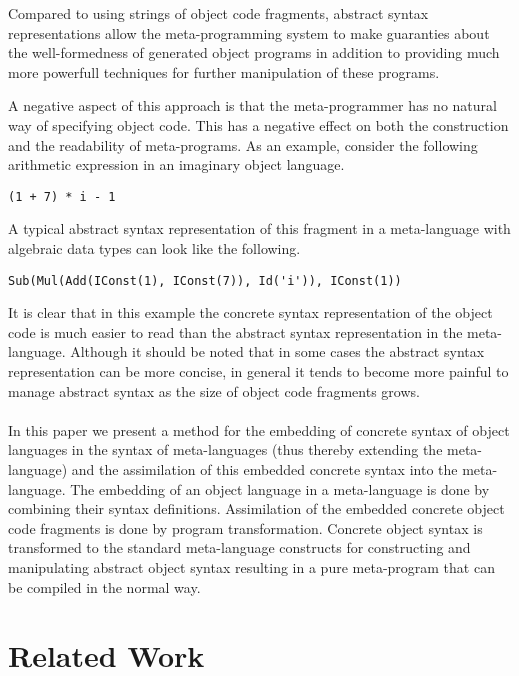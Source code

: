 \documentclass[a4paper,11pt]{article}
\begin{document}
Compared to using strings of object code fragments, abstract syntax
representations allow the meta-programming system to make guaranties about the
well-formedness of generated object programs in addition to providing much more
powerfull techniques for further manipulation of these programs.

A negative aspect of this approach is that the meta-programmer has no natural
way of specifying object code. This has a negative effect on both the
construction and the readability of meta-programs. As an example, consider the
following arithmetic expression in an imaginary object language.
\begin{lstlisting}[title=Example expression in concrete syntax]
(1 + 7) * i - 1
\end{lstlisting}
A typical abstract syntax representation of this fragment in a meta-language
with algebraic data types can look like the following.
\begin{lstlisting}[title=Example expression in abstract syntax]
Sub(Mul(Add(IConst(1), IConst(7)), Id('i')), IConst(1))
\end{lstlisting}
It is clear that in this example the concrete syntax representation of the
object code is much easier to read than the abstract syntax representation in
the meta-language. Although it should be noted that in some cases the abstract
syntax representation can be more concise, in general it tends to become more
painful to manage abstract syntax as the size of object code fragments grows.

\paragraph{}

In this paper we present a method for the embedding of concrete syntax of
object languages in the syntax of meta-languages (thus thereby extending the
meta-language) and the assimilation of this embedded concrete syntax into the
meta-language. The embedding of an object language in a meta-language is done
by combining their syntax definitions. Assimilation of the embedded concrete
object code fragments is done by program transformation. Concrete object
syntax is transformed to the standard meta-language constructs for
constructing and manipulating abstract object syntax resulting in a pure
meta-program that can be compiled in the normal way.


\section{Related Work}\label{sec:related}
\end{document}
